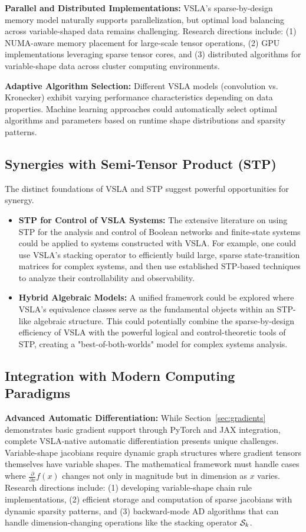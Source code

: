 \textbf{Parallel and Distributed Implementations:} VSLA's sparse-by-design memory model naturally supports parallelization, but optimal load balancing across variable-shaped data remains challenging. Research directions include: (1) NUMA-aware memory placement for large-scale tensor operations, (2) GPU implementations leveraging sparse tensor cores, and (3) distributed algorithms for variable-shape data across cluster computing environments.

\textbf{Adaptive Algorithm Selection:} Different VSLA models (convolution vs. Kronecker) exhibit varying performance characteristics depending on data properties. Machine learning approaches could automatically select optimal algorithms and parameters based on runtime shape distributions and sparsity patterns.

\subsection{Synergies with Semi-Tensor Product (STP)}
The distinct foundations of VSLA and STP suggest powerful opportunities for synergy.
\begin{itemize}
    \item \textbf{STP for Control of VSLA Systems:} The extensive literature on using STP for the analysis and control of Boolean networks and finite-state systems \cite{Cheng2011} could be applied to systems constructed with VSLA. For example, one could use VSLA's stacking operator to efficiently build large, sparse state-transition matrices for complex systems, and then use established STP-based techniques to analyze their controllability and observability.
    \item \textbf{Hybrid Algebraic Models:} A unified framework could be explored where VSLA's equivalence classes serve as the fundamental objects within an STP-like algebraic structure. This could potentially combine the sparse-by-design efficiency of VSLA with the powerful logical and control-theoretic tools of STP, creating a "best-of-both-worlds" model for complex systems analysis.
\end{itemize}

\subsection{Integration with Modern Computing Paradigms}

\textbf{Advanced Automatic Differentiation:} While Section~\ref{sec:gradients} demonstrates basic gradient support through PyTorch and JAX integration, complete VSLA-native automatic differentiation presents unique challenges. Variable-shape jacobians require dynamic graph structures where gradient tensors themselves have variable shapes. The mathematical framework must handle cases where $\frac{\partial}{\partial x} f(x)$ changes not only in magnitude but in dimension as $x$ varies. Research directions include: (1) developing variable-shape chain rule implementations, (2) efficient storage and computation of sparse jacobians with dynamic sparsity patterns, and (3) backward-mode AD algorithms that can handle dimension-changing operations like the stacking operator $\mathcal{S}_k$.

